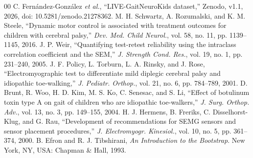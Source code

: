 \documentclass[conference]{IEEEtran}
\begin{document}
\begin{thebibliography}{00}
 C. Fern\'{a}ndez-Gonz\'{a}lez \emph{et al.}, ``LIVE-GaitNeuroKids dataset,'' Zenodo, v1.1, 2026, doi: 10.5281/zenodo.21278362.
 M. H. Schwartz, A. Rozumalski, and K. M. Steele, ``Dynamic motor control is associated with treatment outcomes for children with cerebral palsy,'' \emph{Dev. Med. Child Neurol.}, vol. 58, no. 11, pp. 1139--1145, 2016.
 J. P. Weir, ``Quantifying test-retest reliability using the intraclass correlation coefficient and the SEM,'' \emph{J. Strength Cond. Res.}, vol. 19, no. 1, pp. 231--240, 2005.
 J. F. Policy, L. Torburn, L. A. Rinsky, and J. Rose, ``Electromyographic test to differentiate mild diplegic cerebral palsy and idiopathic toe-walking,'' \emph{J. Pediatr. Orthop.}, vol. 21, no. 6, pp. 784--789, 2001.
 D. Brunt, R. Woo, H. D. Kim, M. S. Ko, C. Senesac, and S. Li, ``Effect of botulinum toxin type A on gait of children who are idiopathic toe-walkers,'' \emph{J. Surg. Orthop. Adv.}, vol. 13, no. 3, pp. 149--155, 2004.
 H. J. Hermens, B. Freriks, C. Disselhorst-Klug, and G. Rau, ``Development of recommendations for SEMG sensors and sensor placement procedures,'' \emph{J. Electromyogr. Kinesiol.}, vol. 10, no. 5, pp. 361--374, 2000.
 B. Efron and R. J. Tibshirani, \emph{An Introduction to the Bootstrap}. New York, NY, USA: Chapman \& Hall, 1993.
\end{thebibliography}
\end{document}
